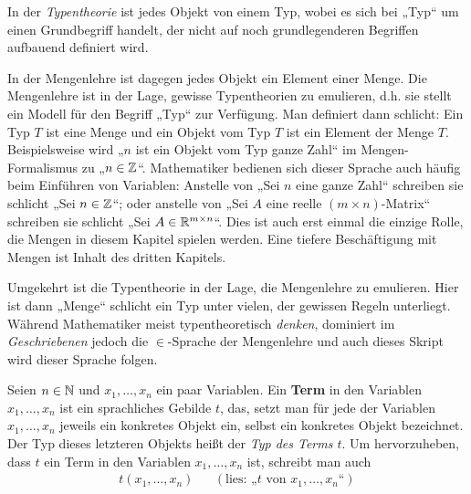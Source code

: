 \begin{bem}
    In der \emph{Typentheorie} ist jedes Objekt von einem Typ, wobei es sich bei „Typ“ um einen Grundbegriff handelt, der nicht auf noch grundlegenderen Begriffen aufbauend definiert wird.

    In der Mengenlehre ist dagegen jedes Objekt ein Element einer Menge. Die Mengenlehre ist in der Lage, gewisse Typentheorien zu emulieren, d.h. sie stellt ein Modell für den Begriff „Typ“ zur Verfügung. Man definiert dann schlicht: Ein Typ $T$ ist eine Menge und ein Objekt vom Typ $T$ ist ein Element der Menge $T$. Beispielsweise wird „$n$ ist ein Objekt vom Typ ganze Zahl“ im Mengen-Formalismus zu „$n\in\mathbb Z$“. Mathematiker bedienen sich dieser Sprache auch häufig beim Einführen von Variablen: Anstelle von „Sei $n$ eine ganze Zahl“ schreiben sie schlicht „Sei $n\in \mathbb Z$“; oder anstelle von „Sei $A$ eine reelle $(m\times n)$-Matrix“ schreiben sie schlicht „Sei $A\in \mathbb R^{m\times n}$“. Dies ist auch erst einmal die einzige Rolle, die Mengen in diesem Kapitel spielen werden. Eine tiefere Beschäftigung mit Mengen ist Inhalt des dritten Kapitels.

    Umgekehrt ist die Typentheorie in der Lage, die Mengenlehre zu emulieren. Hier ist dann „Menge“ schlicht ein Typ unter vielen, der gewissen Regeln unterliegt. Während Mathematiker meist typentheoretisch \emph{denken}, dominiert im \emph{Geschriebenen} jedoch die $\in$-Sprache der Mengenlehre und auch dieses Skript wird dieser Sprache folgen.%
\end{bem}


\begin{defin}[Term] \label{def:term} 
    Seien $n\in \mathbb N$ und $x_1,\dots , x_n$ ein paar Variablen. Ein \textbf{Term} in den Variablen $x_1,\dots , x_n$ ist ein sprachliches Gebilde $t$, das, setzt man für jede der Variablen $x_1,\dots ,x_n$ jeweils ein konkretes Objekt ein, selbst ein konkretes Objekt bezeichnet. Der Typ dieses letzteren Objekts heißt der \emph{Typ des Terms $t$}. Um hervorzuheben, dass $t$ ein Term in den Variablen $x_1,\dots , x_n$ ist, schreibt man auch
    \begin{align*}
        t(x_1,\dots , x_n) && (\text{lies: „$t$ von $x_1,\dots , x_n$“})
    \end{align*}

\end{defin}


